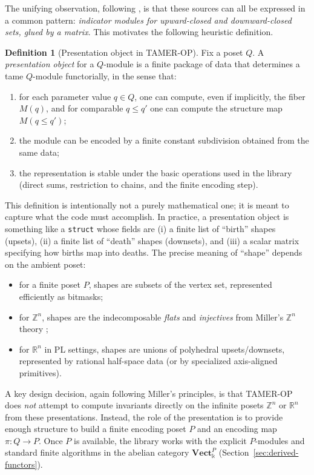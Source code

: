 \documentclass{article}
\newcommand{\kk}{\Bbbk}
\newcommand{\<}{\langle}
\renewcommand{\>}{\rangle}
\theoremstyle{definition}
\newtheorem{defn}[theorem]{Definition}
\theoremstyle{remark}
\begin{document}
	The unifying observation, following \cite{Mil20}, is that these sources can all be expressed in a common
	pattern: \emph{indicator modules for upward-closed and downward-closed sets, glued by a matrix}.
	This motivates the following heuristic definition.
	
	\begin{defn}[Presentation object in TAMER-OP]\label{def:presentation-object}
		Fix a poset $Q$.  A \emph{presentation object} for a $Q$-module is a finite package of data that
		determines a tame $Q$-module functorially, in the sense that:
		\begin{enumerate}[label=(\roman*)]
			\item for each parameter value $q\in Q$, one can compute, even if implicitly, the fiber $M(q)$,
			and for comparable $q\le q'$ one can compute the structure map $M(q\le q')$;
			\item the module can be encoded by a finite constant subdivision obtained from the same data;
			\item the representation is stable under the basic operations used in the library
			(direct sums, restriction to chains, and the finite encoding step).
		\end{enumerate}
	\end{defn}
	
	This definition is intentionally not a purely mathematical one; it is meant to capture what the code must
	accomplish.  In practice, a presentation object is something like a \texttt{struct} whose fields are (i) a finite
	list of ``birth'' shapes (upsets), (ii) a finite list of ``death'' shapes (downsets), and (iii) a scalar
	matrix specifying how births map into deaths.  The precise meaning of ``shape'' depends on the ambient poset:
	\begin{itemize}
		\item for a finite poset $P$, shapes are subsets of the vertex set, represented efficiently as bitmasks;
		\item for $\mathbb{Z}^n$, shapes are the indecomposable \emph{flats} and \emph{injectives} from Miller's
		$\mathbb{Z}^n$ theory \cite{Mil20};
		\item for $\mathbb{R}^n$ in PL settings, shapes are unions of polyhedral upsets/downsets, represented by
		rational half-space data (or by specialized axis-aligned primitives).
	\end{itemize}
	
	A key design decision, again following Miller's principles, is that TAMER-OP does \emph{not} attempt to compute invariants directly on the infinite posets $\mathbb{Z}^n$ or $\mathbb{R}^n$ from these presentations.  Instead, the role of the presentation is to provide enough structure to build a finite encoding poset $P$ and an encoding map $\pi\colon Q\to P$. Once $P$ is available, the library works with the explicit $P$-modules and standard finite algorithms in the abelian category $\mathbf{Vect}_\kk^P$ (Section~\ref{sec:derived-functors}).
	
\end{document}
